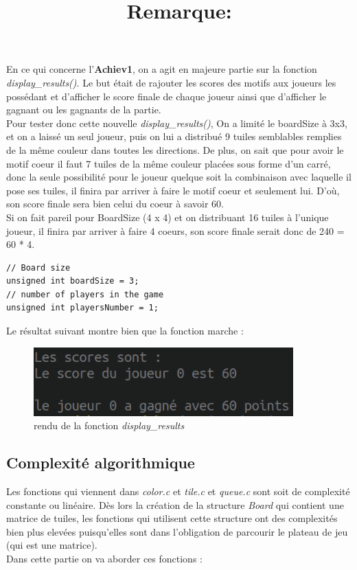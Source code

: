 \documentclass[12pt,a4paper]{extarticle}
\begin{document}
    \title{\textbf{Remarque:}}
    En ce qui concerne l'\textbf{Achiev1}, on a agit en majeure partie sur la fonction
    \emph{display\_results()}. Le but \'etait de rajouter les scores des motifs aux joueurs les poss\'edant
    et d'afficher le score finale de chaque joueur ainsi que d'afficher le gagnant ou les gagnants de la partie.
    \\Pour tester donc cette nouvelle \emph{display\_results()}, On a limit\'e le boardSize \`a 3x3, et on a laiss\'e un seul joueur,
     puis on lui a distribu\'e 9 tuiles
    semblables remplies de la m\^eme couleur dans toutes les directions. De plus, on sait que pour avoir 
    le motif coeur il faut 7 tuiles de la m\^eme couleur plac\'ees sous forme d'un carr\'e, donc la seule 
    possibilit\'e pour le joueur quelque soit la combinaison avec laquelle il pose ses tuiles, il finira
    par arriver \`a faire le motif coeur et seulement lui. D'o\`u, son score finale sera bien celui du 
    coeur \`a savoir 60.
    \\
    Si on fait pareil pour BoardSize (4 x 4) et on distribuant 16 tuiles \`a l'unique joueur, il finira
    par arriver \`a faire 4 coeurs, son score finale serait donc de 240 = 60 * 4.
    \\
    \begin{lstlisting}[style=CStyle]
// Board size 
unsigned int boardSize = 3;
// number of players in the game
unsigned int playersNumber = 1; \end{lstlisting}
    Le r\'esultat suivant montre bien que la fonction marche : 
    \begin{figure}[h!]
        \centering
        \includegraphics[width=10cm]{img/display}
        \caption{rendu de la fonction \emph{display\_results}}
    \end{figure}



    \subsection{Complexit\'e algorithmique}
    Les fonctions qui viennent dans \emph{color.c} et \emph{tile.c} et \emph{queue.c} sont 
    soit de complexit\'e constante ou lin\'eaire.
    D\`es lors la cr\'eation de la structure \emph{Board} qui contient une matrice de tuiles, les fonctions qui utilisent
    cette structure ont des complexit\'es bien plus elev\'ees puisqu'elles sont dans l'obligation de parcourir le plateau 
    de jeu (qui est une matrice).
    \\
    Dans cette partie on va aborder ces fonctions : 
\end{document}
